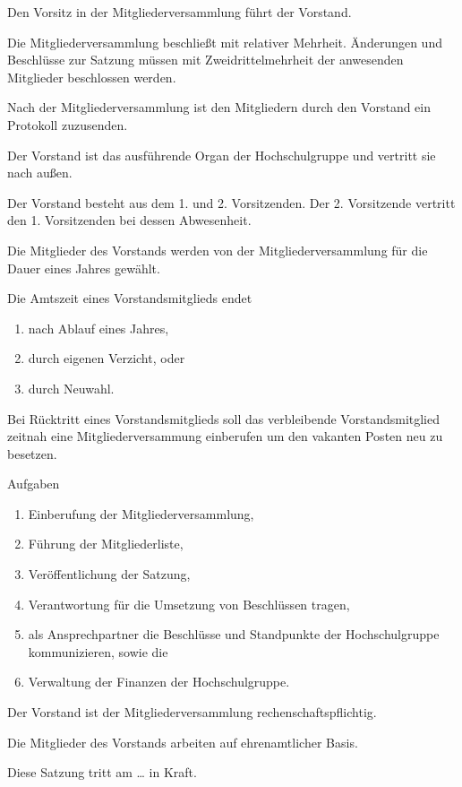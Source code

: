 \documentclass[a4paper, parskip=half, numbers=noenddot]{scrartcl}
\begin{document}
\begin{contract}
Den Vorsitz in der Mitgliederversammlung führt der Vorstand.

Die Mitgliederversammlung beschließt mit relativer Mehrheit. Änderungen und Beschlüsse zur Satzung müssen mit Zweidrittelmehrheit der anwesenden Mitglieder beschlossen werden.

Nach der Mitgliederversammlung ist den Mitgliedern durch den Vorstand ein Protokoll zuzusenden.



%
%

%

Der Vorstand ist das ausführende Organ der Hochschulgruppe und vertritt sie nach außen.

Der Vorstand besteht aus dem 1. und 2. Vorsitzenden. Der 2. Vorsitzende vertritt den 1. Vorsitzenden bei dessen Abwesenheit.

Die Mitglieder des Vorstands werden von der Mitgliederversammlung für die Dauer eines Jahres gewählt.

Die Amtszeit eines Vorstandsmitglieds endet
\begin{enumerate}
  \item nach Ablauf eines Jahres,
  \item durch eigenen Verzicht, oder
  \item durch Neuwahl.
\end{enumerate}
Bei Rücktritt eines Vorstandsmitglieds soll das verbleibende Vorstandsmitglied zeitnah eine Mitgliederversammung einberufen um den vakanten Posten neu zu besetzen.

Aufgaben
\begin{enumerate}
\item Einberufung der Mitgliederversammlung,
\item Führung der Mitgliederliste,
\item Veröffentlichung der Satzung,
\item Verantwortung für die Umsetzung von Beschlüssen tragen,
\item als Ansprechpartner die Beschlüsse und Standpunkte der Hochschulgruppe kommunizieren, sowie die
\item Verwaltung der Finanzen der Hochschulgruppe.
\end{enumerate}

Der Vorstand ist der Mitgliederversammlung rech\-en\-schafts\-pflichtig.

Die Mitglieder des Vorstands arbeiten auf ehrenamtlicher Basis.


%
%


Diese Satzung tritt am \dots{} in Kraft.

\end{contract}
\end{document}
